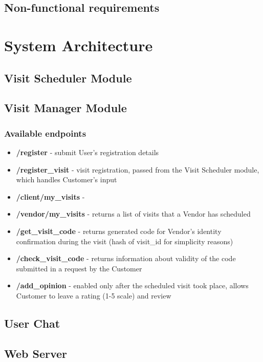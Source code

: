 \documentclass[11pt,a4paper]{article}
\begin{document}
\subsection{Non-functional requirements}

\section{System Architecture}

\subsection{Visit Scheduler Module}

\subsection{Visit Manager Module}

\subsubsection{Available endpoints}
\begin{itemize}
\item \textbf{\slash register} - submit User's registration details
\item \textbf{\slash register\_visit} - visit registration, passed from the Visit Scheduler module, which handles Customer's input
\item \textbf{\slash client/my\_visits} - 
\item \textbf{\slash vendor/my\_visits} - returns a list of visits that a Vendor has scheduled
\item \textbf{\slash get\_visit\_code} - returns generated code for Vendor's identity confirmation during the visit (hash of visit\_id for simplicity reasons)
\item \textbf{\slash check\_visit\_code} - returns information about validity of the code submitted in a request by the Customer
\item \textbf{\slash add\_opinion} - enabled only after the scheduled visit took place, allows Customer to leave a rating (1-5 scale) and review
\end{itemize}


\subsection{User Chat}

\subsection{Web Server}
\end{document}
